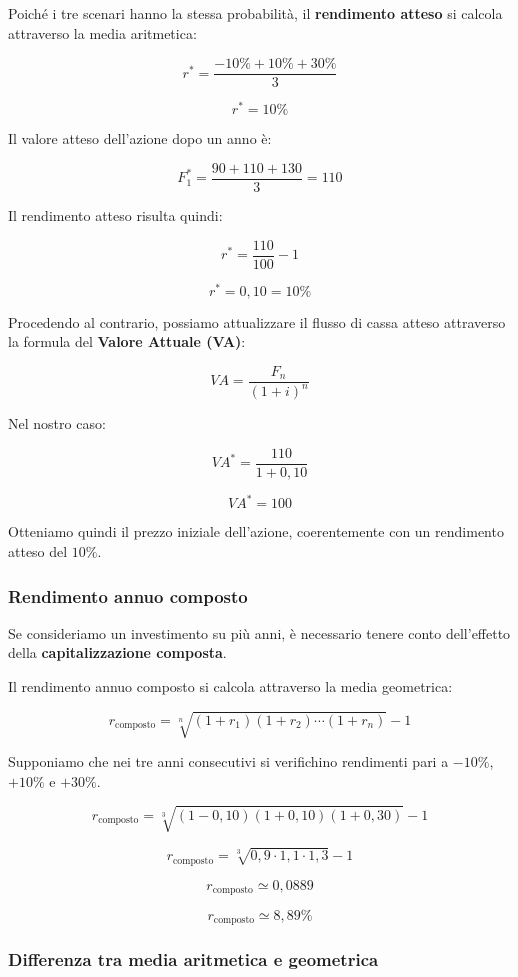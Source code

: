 \noindent Poiché i tre scenari hanno la stessa probabilità,
il \textbf{rendimento atteso} si calcola attraverso la media aritmetica:

\[
r^*=\frac{-10\%+10\%+30\%}{3}
\]

\[
\boxed{r^*=10\%}
\]

\noindent Il valore atteso dell'azione dopo un anno è:

\[
F_1^*=\frac{90+110+130}{3}=110
\]

\noindent Il rendimento atteso risulta quindi:

\[
r^*=\frac{110}{100}-1
\]

\[
\boxed{r^*=0{,}10=10\%}
\]

\noindent Procedendo al contrario, possiamo attualizzare
il flusso di cassa atteso attraverso la formula del
\textbf{Valore Attuale (VA)}:

\[
\boxed{
VA=\frac{F_n}{(1+i)^n}
}
\]

\noindent Nel nostro caso:

\[
VA^*=\frac{110}{1+0{,}10}
\]

\[
\boxed{VA^*=100}
\]

\noindent Otteniamo quindi il prezzo iniziale dell'azione,
coerentemente con un rendimento atteso del $10\%$.

\subsubsection*{Rendimento annuo composto}

\noindent Se consideriamo un investimento su più anni,
è necessario tenere conto dell'effetto della
\textbf{capitalizzazione composta}.

\medskip

\noindent Il rendimento annuo composto si calcola
attraverso la media geometrica:

\[
\boxed{
r_{\text{composto}}=
\sqrt[n]{(1+r_1)(1+r_2)\cdots(1+r_n)}-1
}
\]

\noindent Supponiamo che nei tre anni consecutivi
si verifichino rendimenti pari a $-10\%$, $+10\%$ e $+30\%$.

\[
r_{\text{composto}}=
\sqrt[3]{(1-0{,}10)(1+0{,}10)(1+0{,}30)}-1
\]

\[
r_{\text{composto}}=
\sqrt[3]{0{,}9\cdot1{,}1\cdot1{,}3}-1
\]

\[
r_{\text{composto}}\simeq0{,}0889
\]

\[
\boxed{r_{\text{composto}}\simeq8{,}89\%}
\]

\subsubsection*{Differenza tra media aritmetica e geometrica}

